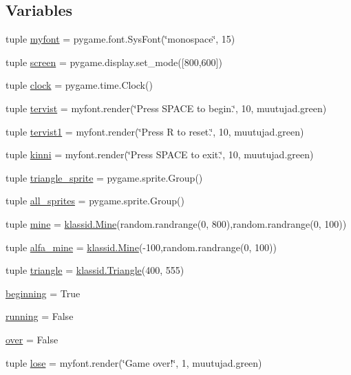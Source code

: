 \subsection*{Variables}
\begin{DoxyCompactItemize}
\item 
tuple \hyperlink{namespace_dodger_1_1main_a5a2e204b9d9a091c33208dd3657e1307}{myfont} = pygame.\+font.\+Sys\+Font(\char`\"{}monospace\char`\"{}, 15)
\item 
tuple \hyperlink{namespace_dodger_1_1main_aae789c71f775508744848c9b4163b416}{screen} = pygame.\+display.\+set\+\_\+mode(\mbox{[}800,600\mbox{]})
\item 
tuple \hyperlink{namespace_dodger_1_1main_a688c4b7dc0b19589a3f62d27a0233a7f}{clock} = pygame.\+time.\+Clock()
\item 
tuple \hyperlink{namespace_dodger_1_1main_aada8d7b289e64fa2cd4da076de1f23c2}{tervist} = myfont.\+render(\char`\"{}Press S\+P\+A\+C\+E to begin.\char`\"{}, 10, muutujad.\+green)
\item 
tuple \hyperlink{namespace_dodger_1_1main_ab3023da733d7bcce7908efc9e646a3d1}{tervist1} = myfont.\+render(\char`\"{}Press R to reset.\char`\"{}, 10, muutujad.\+green)
\item 
tuple \hyperlink{namespace_dodger_1_1main_abc3f766e093308afeae4bb11717428ee}{kinni} = myfont.\+render(\char`\"{}Press S\+P\+A\+C\+E to exit.\char`\"{}, 10, muutujad.\+green)
\item 
tuple \hyperlink{namespace_dodger_1_1main_a4794605b0906db6c42412957da8c5913}{triangle\+\_\+sprite} = pygame.\+sprite.\+Group()
\item 
tuple \hyperlink{namespace_dodger_1_1main_a8ef3adbca26416fcae28a066e6435001}{all\+\_\+sprites} = pygame.\+sprite.\+Group()
\item 
tuple \hyperlink{namespace_dodger_1_1main_a9ce66d4a60e19c14f89b870a580099e4}{mine} = \hyperlink{class_dodger_1_1klassid_1_1_mine}{klassid.\+Mine}(random.\+randrange(0, 800),random.\+randrange(0, 100))
\item 
tuple \hyperlink{namespace_dodger_1_1main_ab1f09b41f09bcf1417ed69012e847012}{alfa\+\_\+mine} = \hyperlink{class_dodger_1_1klassid_1_1_mine}{klassid.\+Mine}(-\/100,random.\+randrange(0, 100))
\item 
tuple \hyperlink{namespace_dodger_1_1main_a5c27661b1b9c13624a07f3757a3bd88a}{triangle} = \hyperlink{class_dodger_1_1klassid_1_1_triangle}{klassid.\+Triangle}(400, 555)
\item 
\hyperlink{namespace_dodger_1_1main_a53770c6e2fd58e07592f4ac4dca29689}{beginning} = True
\item 
\hyperlink{namespace_dodger_1_1main_a2c62876655c9247b65a382ebe35239a8}{running} = False
\item 
\hyperlink{namespace_dodger_1_1main_a13868600ce1e836d5d3e848a5932231d}{over} = False
\item 
tuple \hyperlink{namespace_dodger_1_1main_a6c470cdcf880300fb28ae58cf38bfb92}{lose} = myfont.\+render(\char`\"{}Game over!\char`\"{}, 1, muutujad.\+green)
\end{DoxyCompactItemize}


